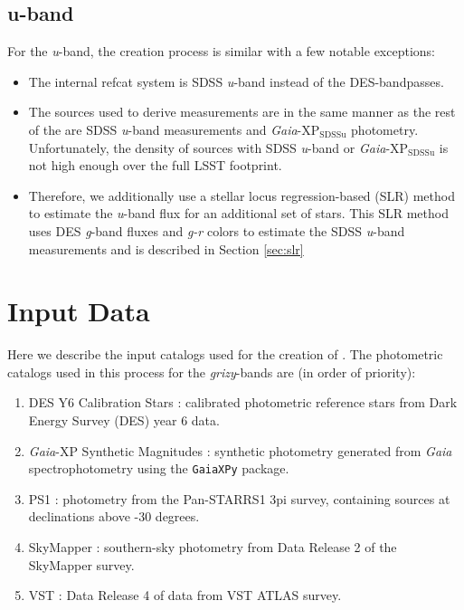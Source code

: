 \subsection{u-band}
For the \textit{u}-band, the creation process is similar with a few notable exceptions:
\begin{itemize}
    \item The internal refcat system is SDSS \textit{u}-band instead of the DES-bandpasses.
    \item The sources used to derive measurements are in the same manner as the rest of the \monster are SDSS \textit{u}-band measurements and \emph{Gaia}-$\mathrm{XP_{SDSSu}}$ photometry. 
    Unfortunately, the density of sources with SDSS \textit{u}-band or \emph{Gaia}-$\mathrm{XP_{SDSSu}}$ is not high enough over the full LSST footprint. 
    \item 
    Therefore, we additionally use a stellar locus regression-based (SLR) method to estimate the \textit{u}-band flux for an additional set of stars. 
    This SLR method uses DES \textit{g}-band fluxes and \textit{g-r} colors to estimate the SDSS \textit{u}-band measurements and is described in Section \ref{sec:slr}
\end{itemize}



\section{Input Data}
\label{sec:input}
Here we describe the input catalogs used for the creation of \monster. 
The photometric catalogs used in this process for the \emph{grizy}-bands are (in order of priority):
\begin{enumerate}
    \item DES Y6 Calibration Stars \citep[Section \ref{sec:des};][]{Rykoff:2023}: calibrated photometric reference stars from Dark Energy Survey (DES) year 6 data.
    \item \emph{Gaia}-XP Synthetic Magnitudes \citep[Section \ref{sec:gaiaxp}][]{GaiaCollaboration:2023-XP}: synthetic photometry generated from \emph{Gaia} spectrophotometry using the \texttt{GaiaXPy} package.
    \item PS1 \citep[Section \ref{sec:ps1};][]{Chambers:2016}: photometry from the Pan-STARRS1 3pi survey, containing sources at declinations above -30 degrees.
    \item SkyMapper \citep[Section \ref{sec:skymapper};][]{Onken:2019}: southern-sky photometry from Data Release 2 of the SkyMapper survey.
    \item VST \citep[Section \ref{sec:vst};][]{Shanks:2015}: Data Release 4 of data from VST ATLAS survey.
\end{enumerate}


